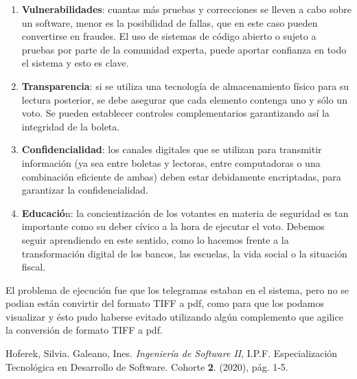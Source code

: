 \documentclass[titlepage,a4paper,twoside]{article}
\begin{document}
    \begin{enumerate}
    	\item \textbf{Vulnerabilidades}: cuantas más pruebas y correcciones se lleven a cabo sobre un software, menor es la posibilidad de fallas, que en este caso pueden convertirse en fraudes. El uso de sistemas de código abierto o sujeto a pruebas por parte de la comunidad experta, puede aportar confianza en todo el sistema y esto es clave.
    	
    	\item \textbf{Transparencia}: si se utiliza una tecnología de almacenamiento físico para su lectura posterior, se debe asegurar que cada elemento contenga uno y sólo un voto. Se pueden establecer controles complementarios garantizando así la integridad de la boleta.
    	
    	\item \textbf{Confidencialidad}: los canales digitales que se utilizan para transmitir información (ya sea entre boletas y lectoras, entre computadoras o una combinación eficiente de ambas) deben estar debidamente encriptadas, para garantizar la confidencialidad.
    	
    	\item \textbf{Educació}n: la concientización de los votantes en materia de seguridad es tan importante como su deber cívico a la hora de ejecutar el voto. Debemos seguir aprendiendo en este sentido, como lo hacemos frente a la transformación digital de los bancos, las escuelas, la vida social o la situación fiscal.
    \end{enumerate}
    El problema de ejecución fue que los telegramas estaban en el sistema, pero no se podian están convirtir del formato TIFF a pdf, como para que los podamos visualizar y ésto pudo haberse evitado utilizando algún complemento que agilice la conversión de formato TIFF a pdf. 
    
    
    \begin{thebibliography}{99}
    	 Hoferek, Silvia. Galeano, Ines. \textit{Ingeniería de Software II}, I.P.F. Especialización Tecnológica en Desarrollo de Software. Cohorte {\bf 2}. (2020),
    	pág. 1-5.
    \end{thebibliography}
\end{document}
